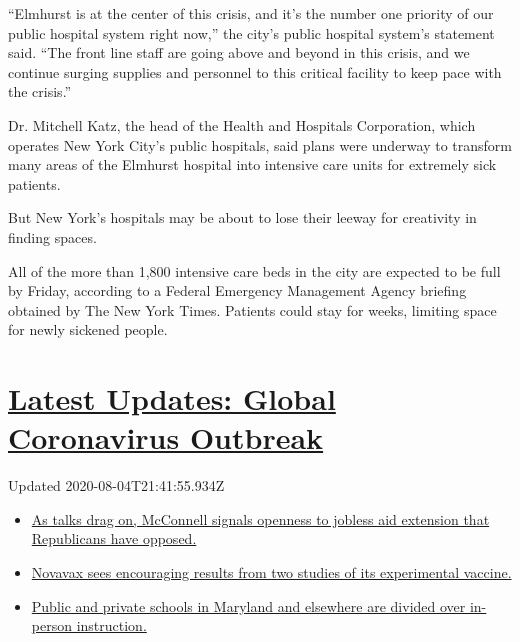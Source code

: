 ``Elmhurst is at the center of this crisis, and it's the number one
priority of our public hospital system right now,'' the city's public
hospital system's statement said. ``The front line staff are going above
and beyond in this crisis, and we continue surging supplies and
personnel to this critical facility to keep pace with the crisis.''

Dr. Mitchell Katz, the head of the Health and Hospitals Corporation,
which operates New York City's public hospitals, said plans were
underway to transform many areas of the Elmhurst hospital into intensive
care units for extremely sick patients.

But New York's hospitals may be about to lose their leeway for
creativity in finding spaces.

All of the more than 1,800 intensive care beds in the city are expected
to be full by Friday, according to a Federal Emergency Management Agency
briefing obtained by The New York Times. Patients could stay for weeks,
limiting space for newly sickened people.

\hypertarget{latest-updates-global-coronavirus-outbreak}{%
\section{\texorpdfstring{\href{https://www.nytimes3xbfgragh.onion/2020/08/04/world/coronavirus-cases.html?action=click\&pgtype=Article\&state=default\&region=MAIN_CONTENT_1\&context=storylines_live_updates}{Latest
Updates: Global Coronavirus
Outbreak}}{Latest Updates: Global Coronavirus Outbreak}}\label{latest-updates-global-coronavirus-outbreak}}

Updated 2020-08-04T21:41:55.934Z

\begin{itemize}
\tightlist
\item
  \href{https://www.nytimes3xbfgragh.onion/2020/08/04/world/coronavirus-cases.html?action=click\&pgtype=Article\&state=default\&region=MAIN_CONTENT_1\&context=storylines_live_updates\#link-2daa96b5}{As
  talks drag on, McConnell signals openness to jobless aid extension
  that Republicans have opposed.}
\item
  \href{https://www.nytimes3xbfgragh.onion/2020/08/04/world/coronavirus-cases.html?action=click\&pgtype=Article\&state=default\&region=MAIN_CONTENT_1\&context=storylines_live_updates\#link-1228a480}{Novavax
  sees encouraging results from two studies of its experimental
  vaccine.}
\item
  \href{https://www.nytimes3xbfgragh.onion/2020/08/04/world/coronavirus-cases.html?action=click\&pgtype=Article\&state=default\&region=MAIN_CONTENT_1\&context=storylines_live_updates\#link-4825b93}{Public
  and private schools in Maryland and elsewhere are divided over
  in-person instruction.}
\end{itemize}

